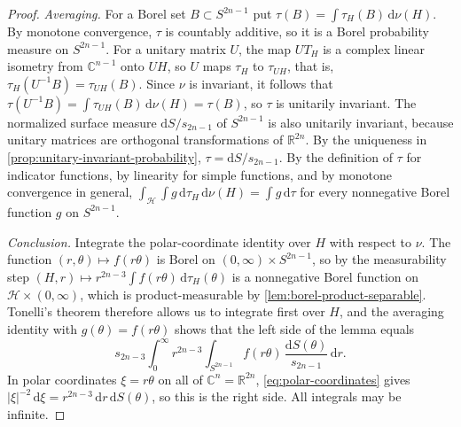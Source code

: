 \begin{proof}
\emph{Averaging.} For a Borel set $B\subset S^{2n-1}$ put $\tau(B)=\int\tau_H(B)\,\mathrm d\nu(H)$. By monotone convergence, $\tau$ is countably additive, so it is a Borel probability measure on $S^{2n-1}$. For a unitary matrix $U$, the map $UT_H$ is a complex linear isometry from $\mathbb C^{n-1}$ onto $UH$, so $U$ maps $\tau_H$ to $\tau_{UH}$, that is, $\tau_H(U^{-1}B)=\tau_{UH}(B)$. Since $\nu$ is invariant, it follows that $\tau(U^{-1}B)=\int\tau_{UH}(B)\,\mathrm d\nu(H)=\tau(B)$, so $\tau$ is unitarily invariant. The normalized surface measure $\mathrm dS/s_{2n-1}$ of $S^{2n-1}$ is also unitarily invariant, because unitary matrices are orthogonal transformations of $\mathbb R^{2n}$. By the uniqueness in \cref{prop:unitary-invariant-probability}, $\tau=\mathrm dS/s_{2n-1}$. By the definition of $\tau$ for indicator functions, by linearity for simple functions, and by monotone convergence in general, $\int_{\mathcal H}\int g\,\mathrm d\tau_H\,\mathrm d\nu(H)=\int g\,\mathrm d\tau$ for every nonnegative Borel function $g$ on $S^{2n-1}$.

\emph{Conclusion.} Integrate the polar-coordinate identity over $H$ with respect to $\nu$. The function $(r,\theta)\mapsto f(r\theta)$ is Borel on $(0,\infty)\times S^{2n-1}$, so by the measurability step $(H,r)\mapsto r^{2n-3}\int f(r\theta)\,\mathrm d\tau_H(\theta)$ is a nonnegative Borel function on $\mathcal H\times(0,\infty)$, which is product-measurable by \cref{lem:borel-product-separable}. Tonelli's theorem therefore allows us to integrate first over $H$, and the averaging identity with $g(\theta)=f(r\theta)$ shows that the left side of the lemma equals
\[
 s_{2n-3}\int_0^\infty r^{2n-3}\int_{S^{2n-1}}f(r\theta)\,\frac{\mathrm d S(\theta)}{s_{2n-1}}\,\mathrm d r.
\]
In polar coordinates $\xi=r\theta$ on all of $\mathbb C^n=\mathbb R^{2n}$, \eqref{eq:polar-coordinates} gives $|\xi|^{-2}\,\mathrm d\xi=r^{2n-3}\,\mathrm d r\,\mathrm dS(\theta)$, so this is the right side. All integrals may be infinite.
\end{proof}

